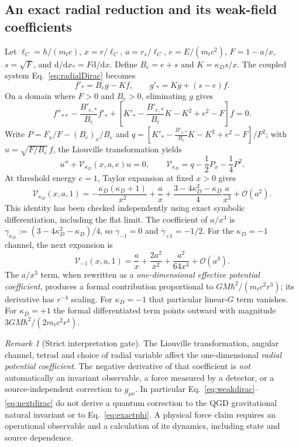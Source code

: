 \documentclass[11pt,a4paper]{article}
\theoremstyle{remark}
\newtheorem{remark}[theorem]{Remark}
\newcommand{\dd}{\mathrm d}
\newcommand{\Ord}{\mathcal O}
\newcommand{\eref}[1]{Eq.~\eqref{#1}}
\begin{document}
\subsection{An exact radial reduction and its weak-field coefficients}
Let $\ell_C=\hbar/(m_tc)$, $x=r/\ell_C$, $a=r_s/\ell_C$, $e=E/(m_tc^2)$, $F=1-a/x$, $s=\sqrt F$, and $\dd/\dd x_*=F\dd/\dd x$. Define $B_e=e+s$ and $K=\kappa_Ds/x$. The coupled system \eref{eq:radialDirac} becomes
\begin{equation}\label{eq:firstpair}
 f'_*=B_eg-Kf,\qquad g'_*=K g+(s-e)f.
\end{equation}
On a domain where $F>0$ and $B_e>0$, eliminating $g$ gives
\begin{equation}\label{eq:elim}
 f''_{**}-\frac{B'_{e,*}}{B_e}f'_*+
\left[K'_*-\frac{B'_{e,*}}{B_e}K-K^2+e^2-F\right]f=0.
\end{equation}
Write $P=F_x/F-(B_e)_x/B_e$ and $q=[K'_*-\frac{B'_{e,*}}{B_e}K-K^2+e^2-F]/F^2$; with $u=\sqrt{F/B_e}\,f$, the Liouville transformation yields
\begin{equation}\label{eq:Veff}
\boxed{u''+\mathcal V_{\kappa_D}(x,a,e)u=0,
\qquad \mathcal V_{\kappa_D}=q-\frac12P_x-\frac14P^2.}
\end{equation}
At threshold energy $e=1$, Taylor expansion at fixed $x>0$ gives
\begin{equation}\label{eq:weakdirac}
\boxed{\mathcal V_{\kappa_D}(x,a,1)=
-\frac{\kappa_D(\kappa_D+1)}{x^2}
+\frac ax+\frac{3-4\kappa_D^2-\kappa_D}{4}\frac a{x^3}+\Ord(a^2).}
\end{equation}
This identity has been checked independently using exact symbolic differentiation, including the flat limit. The coefficient of $a/x^3$ is $\gamma_{\kappa_D}:=(3-4\kappa_D^2-\kappa_D)/4$, so $\gamma_{-1}=0$ and $\gamma_{+1}=-1/2$. For the $\kappa_D=-1$ channel, the next expansion is
\begin{equation}\label{eq:nextdirac}
 \boxed{\mathcal V_{-1}(x,a,1)=\frac ax+\frac{2a^2}{x^2}+\frac{a^2}{64x^4}+\Ord(a^3).}
\end{equation}
The $a/x^3$ term, when rewritten as a \emph{one-dimensional effective potential coefficient}, produces a formal contribution proportional to $GM\hbar^2/(m_tc^2r^3)$; its derivative has $r^{-4}$ scaling. For $\kappa_D=-1$ that particular linear-$G$ term vanishes. For $\kappa_D=+1$ the formal differentiated term points outward with magnitude $3GM\hbar^2/(2m_tc^2r^4)$.

\begin{remark}[Strict interpretation gate]
The Liouville transformation, angular channel, tetrad and choice of radial variable affect the one-dimensional \emph{radial potential coefficient}. The negative derivative of that coefficient is \emph{not} automatically an invariant observable, a force measured by a detector, or a source-independent correction to $g_{\mu\nu}$. In particular \eref{eq:weakdirac}--\eqref{eq:nextdirac} do not derive a quantum correction to the QGD gravitational natural invariant or to \eref{eq:exactphi}. A physical force claim requires an operational observable and a calculation of its dynamics, including state and source dependence.
\end{remark}
\end{document}
